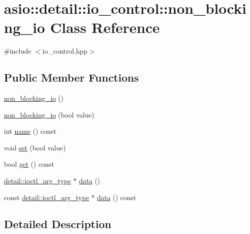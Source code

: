 \hypertarget{classasio_1_1detail_1_1io__control_1_1non__blocking__io}{}\section{asio\+:\+:detail\+:\+:io\+\_\+control\+:\+:non\+\_\+blocking\+\_\+io Class Reference}
\label{classasio_1_1detail_1_1io__control_1_1non__blocking__io}


{\ttfamily \#include $<$io\+\_\+control.\+hpp$>$}

\subsection*{Public Member Functions}
\begin{DoxyCompactItemize}
\item 
\hyperlink{classasio_1_1detail_1_1io__control_1_1non__blocking__io_aadfbd87db479ab02625be7698970ec8b}{non\+\_\+blocking\+\_\+io} ()
\item 
\hyperlink{classasio_1_1detail_1_1io__control_1_1non__blocking__io_a547ae22caa9d9e3704ae9fd54f074741}{non\+\_\+blocking\+\_\+io} (bool value)
\item 
int \hyperlink{classasio_1_1detail_1_1io__control_1_1non__blocking__io_afd8f2dadf22145f3404a3f51f6d645a2}{name} () const 
\item 
void \hyperlink{classasio_1_1detail_1_1io__control_1_1non__blocking__io_ac08a396e356508613be6f3e6108adcd4}{set} (bool value)
\item 
bool \hyperlink{classasio_1_1detail_1_1io__control_1_1non__blocking__io_a12fd972821c8fe5332f96088dc542df6}{get} () const 
\item 
\hyperlink{namespaceasio_1_1detail_a27f72e1b8b785eaaa59ddc6b41751106}{detail\+::ioctl\+\_\+arg\+\_\+type} $\ast$ \hyperlink{classasio_1_1detail_1_1io__control_1_1non__blocking__io_ad2d7dbf5ed6bc2ff2e9ec52f8c789047}{data} ()
\item 
const \hyperlink{namespaceasio_1_1detail_a27f72e1b8b785eaaa59ddc6b41751106}{detail\+::ioctl\+\_\+arg\+\_\+type} $\ast$ \hyperlink{classasio_1_1detail_1_1io__control_1_1non__blocking__io_ad97591bc0d0f186c35481f676c9c3f8e}{data} () const 
\end{DoxyCompactItemize}


\subsection{Detailed Description}


